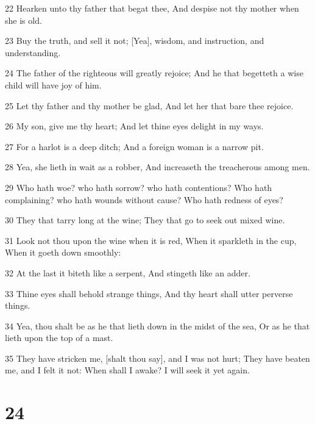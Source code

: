 \par 22 Hearken unto thy father that begat thee, And despise not thy mother when she is old.
\par 23 Buy the truth, and sell it not; [Yea], wisdom, and instruction, and understanding.
\par 24 The father of the righteous will greatly rejoice; And he that begetteth a wise child will have joy of him.
\par 25 Let thy father and thy mother be glad, And let her that bare thee rejoice.
\par 26 My son, give me thy heart; And let thine eyes delight in my ways.
\par 27 For a harlot is a deep ditch; And a foreign woman is a narrow pit.
\par 28 Yea, she lieth in wait as a robber, And increaseth the treacherous among men.
\par 29 Who hath woe? who hath sorrow? who hath contentions? Who hath complaining? who hath wounds without cause? Who hath redness of eyes?
\par 30 They that tarry long at the wine; They that go to seek out mixed wine.
\par 31 Look not thou upon the wine when it is red, When it sparkleth in the cup, When it goeth down smoothly:
\par 32 At the last it biteth like a serpent, And stingeth like an adder.
\par 33 Thine eyes shall behold strange things, And thy heart shall utter perverse things.
\par 34 Yea, thou shalt be as he that lieth down in the midst of the sea, Or as he that lieth upon the top of a mast.
\par 35 They have stricken me, [shalt thou say], and I was not hurt; They have beaten me, and I felt it not: When shall I awake? I will seek it yet again.

\chapter{24}

